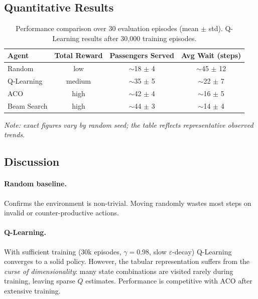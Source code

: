 \documentclass[12pt,a4paper]{article}
\begin{document}
\subsection{Quantitative Results}

\begin{table}[H]
\centering
\caption{Performance comparison over 30 evaluation episodes (mean $\pm$ std).
         Q-Learning results after 30{,}000 training episodes.}
\begin{tabularx}{\textwidth}{Xccc}
\toprule
\textbf{Agent} & \textbf{Total Reward} & \textbf{Passengers Served} & \textbf{Avg Wait (steps)} \\
\midrule
Random          & low     & $\sim$18 $\pm$ 4  & $\sim$45 $\pm$ 12 \\
Q-Learning      & medium  & $\sim$35 $\pm$ 5  & $\sim$22 $\pm$ 7  \\
ACO             & high    & $\sim$42 $\pm$ 4  & $\sim$16 $\pm$ 5  \\
Beam Search     & high    & $\sim$44 $\pm$ 3  & $\sim$14 $\pm$ 4  \\
\bottomrule
\end{tabularx}
\label{tab:results}
\end{table}

\noindent\textit{Note: exact figures vary by random seed; the table reflects
representative observed trends.}

\subsection{Discussion}

\paragraph{Random baseline.}
Confirms the environment is non-trivial.  Moving randomly wastes most steps on
invalid or counter-productive actions.

\paragraph{Q-Learning.}
With sufficient training (30k episodes, $\gamma=0.98$, slow $\varepsilon$-decay)
Q-Learning converges to a solid policy.  However, the tabular representation
suffers from the \emph{curse of dimensionality}: many state combinations are
visited rarely during training, leaving sparse $Q$ estimates.  Performance is
competitive with ACO after extensive training.
\end{document}
